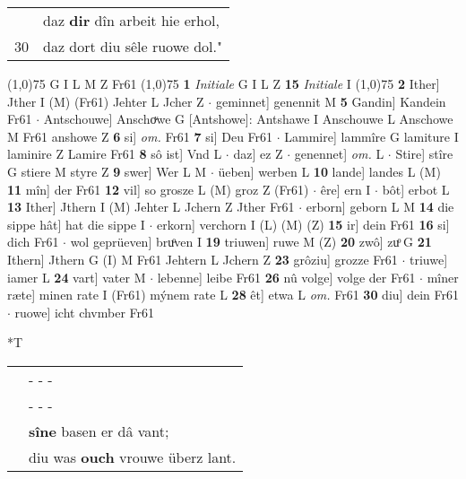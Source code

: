 \documentclass[8pt,a4paper,notitlepage]{article}
\begin{document}
\begin{table}[ht]
\begin{minipage}[t]{0.5\linewidth}
\begin{tabular}{rl}
 & daz \textbf{dir} dîn arbeit hie erhol,\\ 
30 & daz dort diu sêle ruowe dol."\\ 
\end{tabular}
\scriptsize
\line(1,0){75} \newline
G I L M Z Fr61 \newline
\line(1,0){75} \newline
\textbf{1} \textit{Initiale} G I L Z  \textbf{15} \textit{Initiale} I  \newline
\line(1,0){75} \newline
\textbf{2} Ither] Jther I (M) (Fr61) Jehter L Jcher Z  $\cdot$ geminnet] genennit M \textbf{5} Gandin] Kandein Fr61  $\cdot$ Antschouwe] Anschoͮwe G [Antshowe]: Antshawe I Anschouwe L Anschowe M Fr61 anshowe Z \textbf{6} si] \textit{om.} Fr61 \textbf{7} si] Deu Fr61  $\cdot$ Lammire] lammîre G lamiture I laminire Z Lamire Fr61 \textbf{8} sô ist] Vnd L  $\cdot$ daz] ez Z  $\cdot$ genennet] \textit{om.} L  $\cdot$ Stire] stîre G stiere M styre Z \textbf{9} swer] Wer L M  $\cdot$ üeben] werben L \textbf{10} lande] landes L (M) \textbf{11} mîn] der Fr61 \textbf{12} vil] so grosze L (M) groz Z (Fr61)  $\cdot$ êre] ern I  $\cdot$ bôt] erbot L \textbf{13} Ither] Jthern I (M) Jehter L Jchern Z Jther Fr61  $\cdot$ erborn] geborn L M \textbf{14} die sippe hât] hat die sippe I  $\cdot$ erkorn] verchorn I (L) (M) (Z) \textbf{15} ir] dein Fr61 \textbf{16} si] dich Fr61  $\cdot$ wol geprüeven] bruͦven I \textbf{19} triuwen] ruwe M (Z) \textbf{20} zwô] zuͦ G \textbf{21} Ithern] Jthern G (I) M Fr61 Jehtern L Jchern Z \textbf{23} grôziu] grozze Fr61  $\cdot$ triuwe] iamer L \textbf{24} vart] vater M  $\cdot$ lebenne] leibe Fr61 \textbf{26} nû volge] volge der Fr61  $\cdot$ mîner ræte] minen rate I (Fr61) mýnem rate L \textbf{28} êt] etwa L \textit{om.} Fr61 \textbf{30} diu] dein Fr61  $\cdot$ ruowe] icht chvmber Fr61 \newline
\end{minipage}
\hspace{0.5cm}
\begin{minipage}[t]{0.5\linewidth}
\small
\begin{center}*T
\end{center}
\begin{tabular}{rl}
 & \multicolumn{1}{l}{ - - - }\\ 
 & \multicolumn{1}{l}{ - - - }\\ 
 & \textbf{sîne} basen er dâ vant;\\ 
 & diu was \textbf{ouch} vrouwe überz lant.\\ 

\end{tabular}
\end{minipage}
\end{table}
\end{document}
